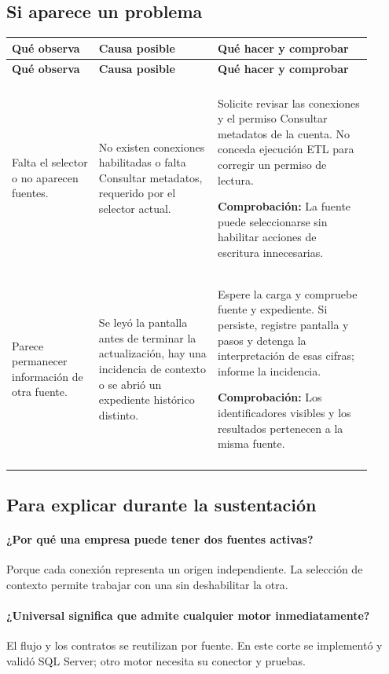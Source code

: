 \subsection{Si aparece un problema}
\begingroup
\fontsize{10}{12.5}\selectfont
\setlength{\tabcolsep}{5pt}
\renewcommand{\arraystretch}{1.15}
\begin{longtable}{@{}>{\RaggedRight\arraybackslash}p{0.22\linewidth}>{\RaggedRight\arraybackslash}p{0.3\linewidth}>{\RaggedRight\arraybackslash}p{0.39\linewidth}@{}}
\toprule
\textbf{Qué observa} & \textbf{Causa posible} & \textbf{Qué hacer y comprobar} \\
\midrule
\endfirsthead
\toprule
\textbf{Qué observa} & \textbf{Causa posible} & \textbf{Qué hacer y comprobar} \\
\midrule
\endhead
\midrule
\multicolumn{3}{r}{\footnotesize Continúa en la página siguiente}\\
\endfoot
\bottomrule
\endlastfoot
Falta el selector o no aparecen fuentes. & No existen conexiones habilitadas o falta Consultar metadatos, requerido por el selector actual. & Solicite revisar las conexiones y el permiso Consultar metadatos de la cuenta. No conceda ejecución ETL para corregir un permiso de lectura.\par\smallskip\textbf{Comprobación:} La fuente puede seleccionarse sin habilitar acciones de escritura innecesarias. \\
\addlinespace[3pt]
Parece permanecer información de otra fuente. & Se leyó la pantalla antes de terminar la actualización, hay una incidencia de contexto o se abrió un expediente histórico distinto. & Espere la carga y compruebe fuente y expediente. Si persiste, registre pantalla y pasos y detenga la interpretación de esas cifras; informe la incidencia.\par\smallskip\textbf{Comprobación:} Los identificadores visibles y los resultados pertenecen a la misma fuente. \\
\addlinespace[3pt]
\end{longtable}
\endgroup

\subsection{Para explicar durante la sustentación}
\paragraph{¿Por qué una empresa puede tener dos fuentes activas?} Porque cada conexión representa un origen independiente. La selección de contexto permite trabajar con una sin deshabilitar la otra.

\paragraph{¿Universal significa que admite cualquier motor inmediatamente?} El flujo y los contratos se reutilizan por fuente. En este corte se implementó y validó SQL Server; otro motor necesita su conector y pruebas.


